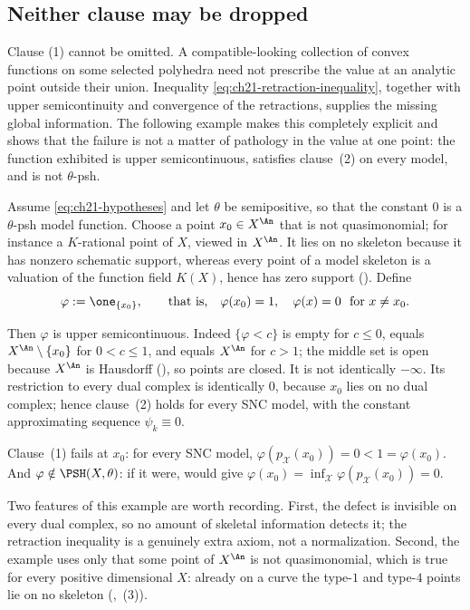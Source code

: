 \subsection{Neither clause may be dropped}
\label{sec:ch21-clauses-independent}

Clause (1) cannot be omitted.  A compatible-looking collection of convex
functions on some selected polyhedra need not prescribe the value at an
analytic point outside their union.  Inequality
\eqref{eq:ch21-retraction-inequality}, together with upper
semicontinuity and convergence of the retractions, supplies the missing
global information.  The following example makes this completely explicit
and shows that the failure is not a matter of pathology in the value at one
point: the function exhibited is upper semicontinuous, satisfies clause~(2)
on every model, and is not \(\theta\)-psh.

\begin{example}
\label{ex:ch21-clause-one-needed}
Assume \eqref{eq:ch21-hypotheses} and let \(\theta\) be semipositive, so
that the constant \(0\) is a \(\theta\)-psh model function.  Choose a point
\(x_0\in X^{\An}\) that is not quasimonomial; for instance a
\(K\)-rational point of \(X\), viewed in \(X^{\An}\).  It lies on no
skeleton because it has nonzero schematic support, whereas every point of a
model skeleton is a valuation of the function field \(K(X)\), hence has
zero support
().
Define
\[
 \varphi:=\one_{\{x_0\}},
 \qquad\text{that is,}\quad
 \varphi(x_0)=1,\quad \varphi(x)=0\ \text{ for }x\neq x_0 .
\]

Then \(\varphi\) is upper semicontinuous.  Indeed \(\{\varphi<c\}\) is empty
for \(c\leq0\), equals \(X^{\An}\setminus\{x_0\}\) for \(0<c\leq1\), and
equals \(X^{\An}\) for \(c>1\); the middle set is open because \(X^{\An}\) is
Hausdorff (), so points are closed.  It is not
identically \(-\infty\).  Its restriction to every dual complex is
identically \(0\), because \(x_0\) lies on no dual complex; hence
clause~(2) holds for every SNC model, with the constant approximating
sequence \(\psi_k\equiv0\).

Clause~(1) fails at \(x_0\): for every SNC model,
\(\varphi(p_{\mathcal X}(x_0))=0<1=\varphi(x_0)\).  And \(\varphi\notin
\PSH(X,\theta)\): if it were, 
would give \(\varphi(x_0)=\inf_{\mathcal X}\varphi(p_{\mathcal X}(x_0))=0\).

Two features of this example are worth recording.  First, the defect is
invisible on every dual complex, so no amount of skeletal information
detects it; the retraction inequality is a genuinely extra axiom, not a
normalization.  Second, the example uses only that some point of
\(X^{\An}\) is not quasimonomial, which is true for every positive
dimensional \(X\): already on a curve the type-\(1\) and type-\(4\) points
lie on no skeleton (,
\,(3)).
\end{example}

